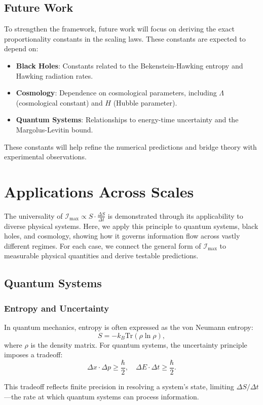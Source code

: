 \documentclass[12pt]{article}
\begin{document}
\subsection{Future Work}
To strengthen the framework, future work will focus on deriving the exact proportionality constants in the scaling laws. These constants are expected to depend on:
\begin{itemize}
    \item \textbf{Black Holes}: Constants related to the Bekenstein-Hawking entropy and Hawking radiation rates.
    \item \textbf{Cosmology}: Dependence on cosmological parameters, including \( \Lambda \) (cosmological constant) and \( H \) (Hubble parameter).
    \item \textbf{Quantum Systems}: Relationships to energy-time uncertainty and the Margolus-Levitin bound.
\end{itemize}

These constants will help refine the numerical predictions and bridge theory with experimental observations.

\section{Applications Across Scales}
The universality of \( \mathcal{I}_{\text{max}} \propto S \cdot \frac{\Delta S}{\Delta t} \) is demonstrated through its applicability to diverse physical systems. Here, we apply this principle to quantum systems, black holes, and cosmology, showing how it governs information flow across vastly different regimes. For each case, we connect the general form of \( \mathcal{I}_{\text{max}} \) to measurable physical quantities and derive testable predictions.

\subsection{Quantum Systems}
\subsubsection{Entropy and Uncertainty}
In quantum mechanics, entropy is often expressed as the von Neumann entropy:
\[
S = -k_B \text{Tr}(\rho \ln \rho),
\]
where \( \rho \) is the density matrix. For quantum systems, the uncertainty principle imposes a tradeoff:
\[
\Delta x \cdot \Delta p \geq \frac{\hbar}{2}, \quad \Delta E \cdot \Delta t \geq \frac{\hbar}{2}.
\]

This tradeoff reflects finite precision in resolving a system's state, limiting \( \Delta S / \Delta t \)—the rate at which quantum systems can process information.
\end{document}
